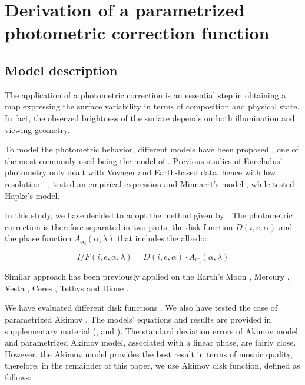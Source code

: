 \documentclass{arxiv-icarus}
\begin{document}
\section{Derivation of a parametrized photometric correction function}\label{sec:sec_3}
\subsection{Model description}

The application of a photometric correction is an essential step in obtaining a map expressing the surface variability in terms of composition and physical state. In fact, the observed brightness of the surface depends on both illumination and viewing geometry.

To model the photometric behavior, different models have been proposed \citep{Minnaert1941, Buratti1985a, Shkuratov2011}, one of the most commonly used being the model of \cite{Hapke1963, Hapke1981, Hapke2012}. Previous studies of Enceladus' photometry only dealt with Voyager and Earth-based data, hence with low resolution \citep{Buratti1984, Buratti1984b, Verbiscer1994}. \cite{Buratti1984}, tested an empirical expression and Minnaert's model \citep[eqs. (1) and (2) in][]{Buratti1984}, while \cite{Verbiscer1994} tested Hapke's model.

In this study, we have decided to adopt the method given by \cite{Shkuratov2011}. The photometric correction is therefore separated in two parts; the disk function $D(i, e, \alpha)$ and the phase function $A_\textrm{eq} (\alpha, \lambda)$ that includes the albedo:

\begin{equation}
    I/F (i, e, \alpha, \lambda) = D(i, e, \alpha) \cdot A_\textrm{eq} (\alpha, \lambda)
\end{equation}

Similar approach has been previously applied on the Earth's Moon \citep{Shkuratov1999, Shkuratov2011, Kreslavsky2000}, Mercury \citep{Domingue2016}, Vesta \citep{Schroder2013, Combe2015}, Ceres \citep{Schroder2017}, Tethys and Dione \citep{Filacchione2018a, Filacchione2018}.

We have evaluated different disk functions \citep{Minnaert1941, Akimov1976, Akimov1988}. We also have tested the case of parametrized Akimov \citep[eq. (19) in][]{Shkuratov2011}. The models' equations and results are provided in supplementary material (,  and ). The standard deviation errors of Akimov model and parametrized Akimov model, associated with a linear phase, are fairly close. However, the Akimov model provides the best result in terms of mosaic quality, therefore, in the remainder of this paper, we use Akimov disk function, defined as follows:
\end{document}
